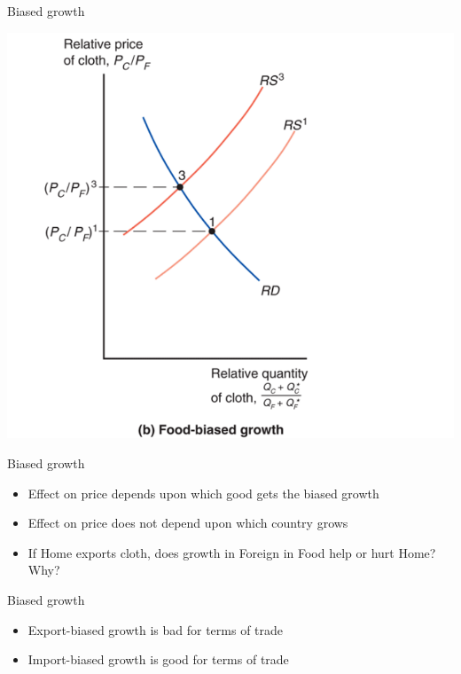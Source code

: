\documentclass[ignorenonframetext,]{beamer}
\begin{document}
\begin{frame}{Biased growth}

    \includegraphics[scale=0.25]{food_growth.png}

\end{frame}

\begin{frame}{Biased growth}

    \begin{itemize}
        \item Effect on price depends upon which good gets the biased growth
        \item Effect on price does not depend upon which country grows
        \item If Home exports cloth, does growth in Foreign in Food help or hurt Home? Why?
    \end{itemize}

\end{frame}

\begin{frame}{Biased growth}

    \begin{itemize}
        \item Export-biased growth is bad for terms of trade
        \item Import-biased growth is good for terms of trade
    \end{itemize}

\end{frame}
\end{document}
